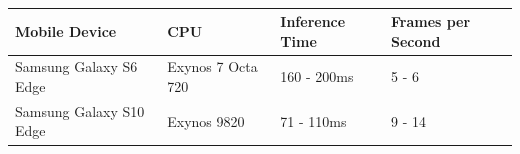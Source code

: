 \begin{table}
    \footnotesize
    \begin{tabularx}{\textwidth}{l|l|l|l}
        \hline
        Mobile Device & CPU & Inference Time & Frames per Second \\ \hline
        Samsung Galaxy S6 Edge & Exynos 7 Octa 720 & 160 - 200ms & 5 - 6 \\ \hline
        Samsung Galaxy S10 Edge & Exynos 9820 & 71 - 110ms & 9 - 14  \\ \hline
    \end{tabularx}
    \caption{}
    \label{table:android-tests}
\end{table}